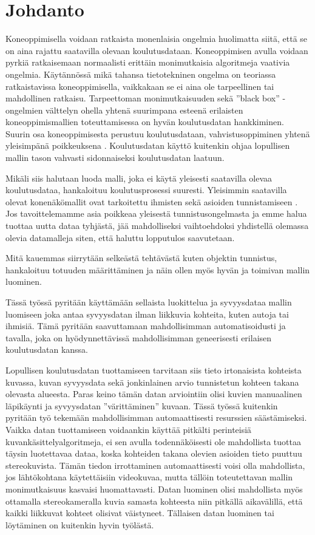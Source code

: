 \chapter{Johdanto}%
\label{ch:johdanto}

Koneoppimisella voidaan ratkaista monenlaisia ongelmia huolimatta siitä, että se on aina rajattu saatavilla olevaan koulutusdataan.  
Koneoppimisen avulla voidaan pyrkiä ratkaisemaan normaalisti erittäin monimutkaisia algoritmeja vaativia ongelmia.  
Käytännössä mikä tahansa tietotekninen ongelma on teoriassa ratkaistavissa koneoppimisella,  
vaikkakaan se ei aina ole tarpeellinen tai mahdollinen ratkaisu.  
Tarpeettoman monimutkaisuuden sekä ”black box” -ongelmien välttelyn ohella  
yhtenä suurimpana esteenä erilaisten koneoppimismallien toteuttamisessa on hyvän koulutusdatan hankkiminen.  
Suurin osa koneoppimisesta perustuu koulutusdataan, vahvistusoppiminen yhtenä yleisimpänä poikkeuksena \cite{alma9911523590705973}.  
Koulutusdatan käyttö kuitenkin ohjaa lopullisen mallin tason vahvasti sidonnaiseksi koulutusdatan laatuun.  

Mikäli siis halutaan luoda malli, joka ei käytä yleisesti saatavilla olevaa koulutusdataa,  
hankaloituu koulutusprosessi suuresti.
Yleisimmin saatavilla olevat konenäkömallit ovat tarkoitettu ihmisten sekä asioiden tunnistamiseen \cite{kagglecomvis}.  
Jos tavoittelemamme asia poikkeaa yleisestä tunnistusongelmasta ja emme halua tuottaa uutta dataa tyhjästä, 
jää mahdolliseksi vaihtoehdoksi yhdistellä olemassa olevia datamalleja siten,  
että haluttu lopputulos saavutetaan.  

Mitä kauemmas siirrytään selkeästä tehtävästä kuten objektin tunnistus,
hankaloituu totuuden määrittäminen ja näin ollen myös hyvän ja toimivan mallin luominen.

Tässä työssä pyritään käyttämään sellaista luokittelua ja syvyysdataa mallin luomiseen joka antaa syvyysdatan
ilman liikkuvia kohteita, kuten autoja tai ihmisiä.
Tämä pyritään saavuttamaan mahdollisimman automatisoidusti  
ja tavalla, joka on hyödynnettävissä mahdollisimman geneerisesti erilaisen koulutusdatan kanssa.  

Lopullisen koulutusdatan tuottamiseen tarvitaan siis tieto irtonaisista kohteista kuvassa,  
kuvan syvyysdata sekä jonkinlainen arvio tunnistetun kohteen takana olevasta alueesta.  
Paras keino tämän datan arviointiin olisi kuvien manuaalinen läpikäynti ja syvyysdatan ”värittäminen” kuvaan.  
Tässä työssä kuitenkin pyritään työ tekemään mahdollisimman automaattisesti resurssien säästämiseksi.
Vaikka datan tuottamiseen voidaankin käyttää pitkälti perinteisiä kuvankäsittelyalgoritmeja, 
ei sen avulla todennäköisesti ole mahdollista tuottaa täysin luotettavaa dataa,  
koska kohteiden takana olevien asioiden tieto puuttuu stereokuvista.  
Tämän tiedon irrottaminen automaattisesti voisi olla mahdollista, jos lähtökohtana käytettäisiin videokuvaa,  
mutta tällöin toteutettavan mallin monimutkaisuus kasvaisi huomattavasti.  
Datan luominen olisi mahdollista myös ottamalla stereokameralla kuvia samasta kohteesta niin pitkällä aikavälillä, että kaikki liikkuvat kohteet olisivat väistyneet.  
Tällaisen datan luominen tai löytäminen on kuitenkin hyvin työlästä.

